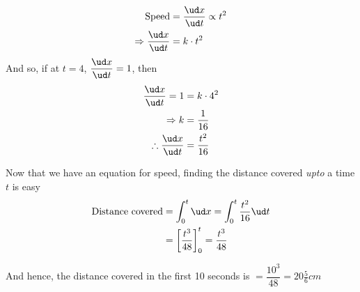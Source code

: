 \begin{solution}
  \begin{align}
     \text{Speed} &= \dfrac{\ud x}{\ud t} \propto t^2 \\
     \Rightarrow \dfrac{\ud x}{\ud t} &= k\cdot t^2
  \end{align}
  And so, if at $t=4$, $\dfrac{\ud x}{\ud t} = 1$, then 
  \begin{align}
     \dfrac{\ud x}{\ud t} = 1 &= k\cdot 4^2 \\
     \Rightarrow k &= \frac{1}{16} \\
     \therefore \dfrac{\ud x}{\ud t} &= \dfrac{t^2}{16}
  \end{align}
  
  Now that we have an equation for speed, finding the distance covered \textit{upto}
  a time $t$ is easy
  \begin{align}
     \text{Distance covered} &= \int_{0}^{t} \ud x = \int_0^{t}\dfrac{t^2}{16}\ud t \\
     &= \left[ \dfrac{t^3}{48}\right]_0^{t} = \dfrac{t^3}{48}
  \end{align}
  
  And hence, the distance covered in the first 10 seconds is $ = \dfrac{10^3}{48} = 20\frac{5}{6}cm$
\end{solution}

